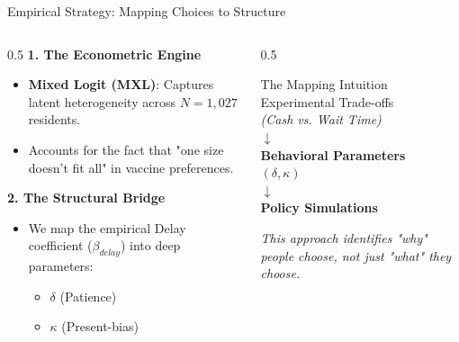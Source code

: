 \documentclass[10pt]{beamer}
\begin{document}
\begin{frame}{Empirical Strategy: Mapping Choices to Structure}
    \begin{columns}[T]
        \begin{column}{0.5\textwidth}
            \textbf{1. The Econometric Engine}
            \begin{itemize}
                \item \textbf{Mixed Logit (MXL)}: Captures latent heterogeneity across $N=1,027$ residents.
                \item Accounts for the fact that "one size doesn't fit all" in vaccine preferences.
            \end{itemize}
            
            \vspace{1cm}
            
            \textbf{2. The Structural Bridge}
            \begin{itemize}
                \item We map the empirical \alert{Delay coefficient} ($\beta_{delay}$) into deep parameters:
                \begin{itemize}
                    \item $\delta$ (Patience)
                    \item $\kappa$ (Present-bias)
                \end{itemize}
            \end{itemize}
        \end{column}
        
        \begin{column}{0.5\textwidth}
            \centering
            \begin{exampleblock}{The Mapping Intuition}
                \centering
                \small
                Experimental Trade-offs \\
                \textit{(Cash vs. Wait Time)} \\
                \vspace{0.3cm}
                $\downarrow$ \\
                \vspace{0.3cm}
                \textbf{Behavioral Parameters} \\
                $(\delta, \kappa)$ \\
                \vspace{0.3cm}
                $\downarrow$ \\
                \vspace{0.3cm}
                \alert{\textbf{Policy Simulations}}
            \end{exampleblock}
            \vfill
            \scriptsize \textit{This approach identifies "why" people choose, not just "what" they choose.}
        \end{column}
    \end{columns}
\end{frame}
\end{document}
